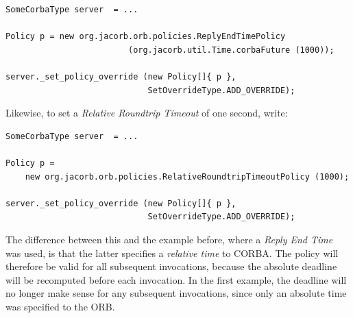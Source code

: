 \begin{verbatim}
SomeCorbaType server  = ...

Policy p = new org.jacorb.orb.policies.ReplyEndTimePolicy
                         (org.jacorb.util.Time.corbaFuture (1000));

server._set_policy_override (new Policy[]{ p },
                             SetOverrideType.ADD_OVERRIDE);
\end{verbatim}

Likewise, to set a \emph{Relative Roundtrip Timeout} of one second,
write:

\begin{verbatim}
SomeCorbaType server  = ...

Policy p =
    new org.jacorb.orb.policies.RelativeRoundtripTimeoutPolicy (1000);

server._set_policy_override (new Policy[]{ p },
                             SetOverrideType.ADD_OVERRIDE);
\end{verbatim}

The difference between this and the example before, where a
\emph{Reply End Time} was used, is that the latter specifies a
\emph{relative time} to CORBA.  The policy will therefore be valid
for all subsequent invocations, because the absolute deadline will be
recomputed before each invocation.  In the first example, the
deadline will no longer make sense for any subsequent invocations,
since only an absolute time was specified to the ORB.


